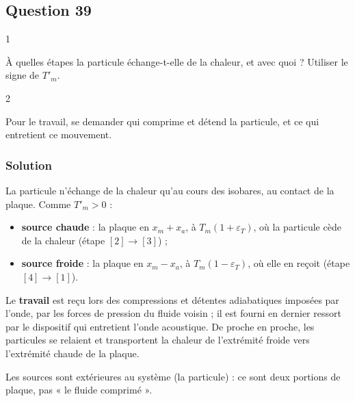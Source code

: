 \documentclass[11pt,a4paper]{article}
\providecommand{\tightlist}{\setlength{\itemsep}{0pt}\setlength{\parskip}{0pt}}
\begin{document}
\hypertarget{question-39}{%
\subsection{Question 39}\label{question-39}}

\begin{indication}{1}

À quelles étapes la particule échange-t-elle de la chaleur, et avec quoi ? Utiliser le signe de \(T'_m\).

\end{indication}

\begin{indication}{2}

Pour le travail, se demander qui comprime et détend la particule, et ce qui entretient ce mouvement.

\end{indication}

\hypertarget{solution-38}{%
\subsubsection{Solution}\label{solution-38}}

La particule n'échange de la chaleur qu'au cours des isobares, au contact de la plaque. Comme \(T'_m>0\) :

\begin{itemize}
\tightlist
\item
  \textbf{source chaude} : la plaque en \(x_m+x_a\), à \(T_m(1+\varepsilon_T)\), où la particule cède de la chaleur (étape \([2]\to[3]\)) ;
\item
  \textbf{source froide} : la plaque en \(x_m-x_a\), à \(T_m(1-\varepsilon_T)\), où elle en reçoit (étape \([4]\to[1]\)).
\end{itemize}

Le \textbf{travail} est reçu lors des compressions et détentes adiabatiques imposées par l'onde, par les forces de pression du fluide voisin ; il est fourni en dernier ressort par le dispositif qui entretient l'onde acoustique. De proche en proche, les particules se relaient et transportent la chaleur de l'extrémité froide vers l'extrémité chaude de la plaque.

\begin{piege}

Les sources sont extérieures au système (la particule) : ce sont deux portions de plaque, pas « le fluide comprimé ».

\end{piege}
\end{document}
